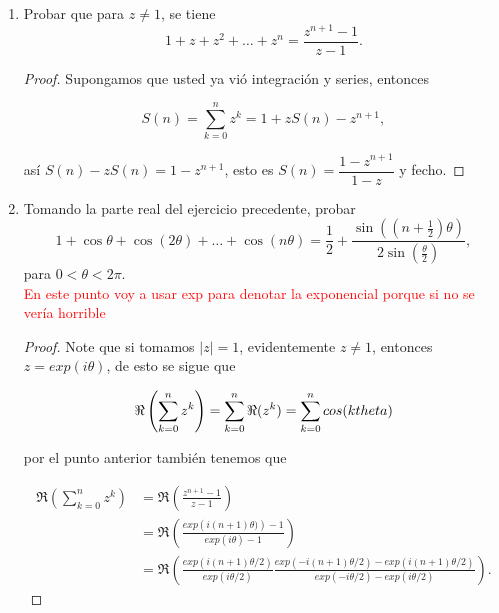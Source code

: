 \documentclass[11pt]{article}
\begin{document}
\begin{enumerate}
    \begin{proof}
    Reemplazando $z$ en las ecuaciones anteriores obtenemos que

    $$\frac{e^{iz}+e^{-iz}}{2}=\Re(e^{iz})=\Re(\cos(z)+i\sin(z))=cos(z)$$

    análogamente $\displaystyle\frac{e^{iz}-e^{-iz}}{2i}=\sin(z)$, luego los ceros coinciden en ambas expreciones \textcolor{red}{depronto estoy  tirando burradas xd}
    \end{proof}

    \item Probar que para $z \neq 1$, se tiene
    \[
    1 + z + z^2 + \dots + z^n = \dfrac{z^{n+1} - 1}{z - 1}.
    \]

    \begin{proof}
    Supongamos que usted ya vió integración y series, entonces

    $$S(n)=\sum_{k=0}^{n} z^k=1+zS(n)-z^{n+1},$$

    así $S(n)-zS(n)=1-z^{n+1}$, esto es $S(n)=\dfrac{1-z^{n+1}}{1-z}$ y fecho. 
    \end{proof}

    \item Tomando la parte real del ejercicio precedente, probar
    \[
    1 + \cos \theta + \cos(2\theta) + \dots + \cos(n\theta) = \frac{1}{2} + \frac{\sin\left((n + \frac{1}{2})\theta\right)}{2 \sin\left(\frac{\theta}{2}\right)},
    \]
    para $0 < \theta < 2\pi$.\\

    \textcolor{red}{En este punto voy a usar exp para denotar la exponencial porque si no se vería horrible}

    \begin{proof}
    Note que si tomamos $|z|=1$, evidentemente $z\neq 1$, entonces $z=exp(i\theta)$, de esto se sigue que

    $$\Re\left(\sum_{k=0}^{n} z^k\right)=\sum_{k=0}^{n} \Re(z^k)=\sum_{k=0}^{n}cos(k\\theta)$$

    por el punto anterior también tenemos que

    \begin{align*}
      \Re\left(\sum_{k=0}^{n} z^k\right)&=\Re\left(\frac{z^{n+1}-1}{z-1}\right)\\
      &=\Re\left(\frac{exp\left(i(n+1)\theta)\right) -1}{exp(i\theta)-1}\right)\\
      &=\Re\left(\frac{exp(i(n+1)\theta/2)}{exp(i\theta/2)}\frac{exp(-i(n+1)\theta/2)-exp(i(n+1)\theta/2)}{exp(-i\theta/2)-exp(i\theta/2)}\right)
    .\end{align*}


\end{proof}
\end{enumerate}
\end{document}
